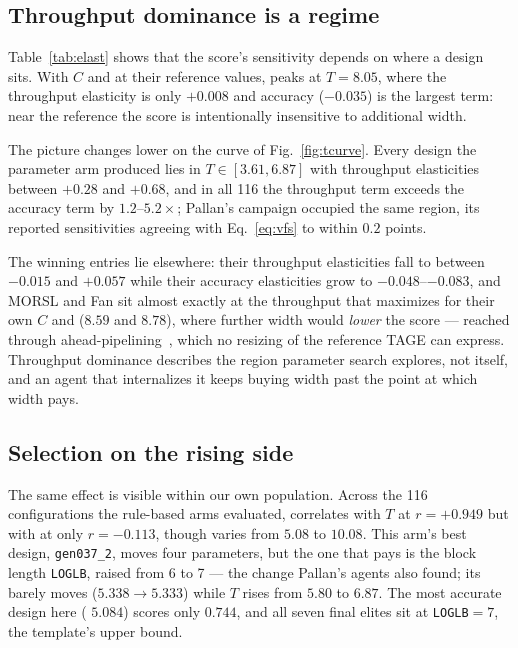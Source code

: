 \documentclass[conference]{IEEEtran}
\newcommand{\vfs}{\text{VFS}}
\newcommand{\mpki}{\text{MPKI}}
\newcommand{\epi}{\text{EPI}}
\begin{document}
\subsection{Throughput dominance is a regime}

Table~\ref{tab:elast} shows that the score's sensitivity depends on where a
design sits. With $C$ and \epi{} at their reference values, \vfs{} peaks at
$T=8.05$, where the throughput elasticity is only $+0.008$ and accuracy
($-0.035$) is the largest term: near the reference the score is intentionally
insensitive to additional width.

The picture changes lower on the curve of Fig.~\ref{fig:tcurve}. Every design
the parameter arm produced lies in $T\in[3.61,6.87]$ with throughput
elasticities between $+0.28$ and $+0.68$, and in all 116 the throughput term
exceeds the accuracy term by $1.2$--$5.2\times$; Pallan's campaign occupied the
same region, its reported sensitivities agreeing with Eq.~\eqref{eq:vfs} to
within $0.2$ points.

The winning entries lie elsewhere: their throughput elasticities fall to between
$-0.015$ and $+0.057$ while their accuracy elasticities grow to
$-0.048$--$-0.083$, and MORSL and Fan sit almost exactly at the throughput that
maximizes \vfs{} for their own $C$ and \epi{} ($8.59$ and $8.78$), where further
width would \emph{lower} the score --- reached through
ahead-pipelining~\cite{koizumi,fan,dang}, which no resizing of the reference
TAGE can express. Throughput dominance describes the region parameter search
explores, not \vfs{} itself, and an agent that internalizes it keeps buying
width past the point at which width pays.

\subsection{Selection on the rising side}

The same effect is visible within our own population. Across the 116
configurations the rule-based arms evaluated, \vfs{} correlates with $T$ at
$r=+0.949$ but with \mpki{} at only $r=-0.113$, though \mpki{} varies from
$5.08$ to $10.08$. This arm's best design, \texttt{gen037\_2}, moves four
parameters, but the one that pays is the block length \texttt{LOGLB}, raised
from 6 to 7 --- the change Pallan's agents also found; its \mpki{} barely moves
($5.338\to5.333$) while $T$ rises from $5.80$ to $6.87$. The most accurate design here (\mpki{} $5.084$) scores only
$0.744$, and all seven final elites sit at \texttt{LOGLB}$=7$, the template's
upper bound.
\end{document}
